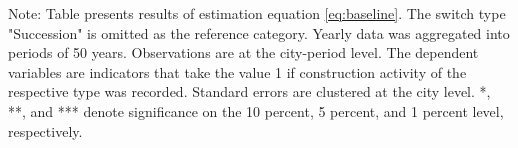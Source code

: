 \begin{table}[htbp]
\begin{tabular}{lcccc}
      
   \end{tabular}
   
   \par \raggedright 
   Note: Table presents results of estimation equation \eqref{eq:baseline}. The switch type "Succession" is omitted as the  reference category. Yearly data was aggregated into periods of 50 years. Observations are at the city-period  level. The dependent variables are indicators that take the value 1 if  construction activity of the respective type was recorded. Standard errors are  clustered at the city level. *, **, and *** denote significance on the 10 percent, 5 percent, and 1 percent  level, respectively.
\end{table}
